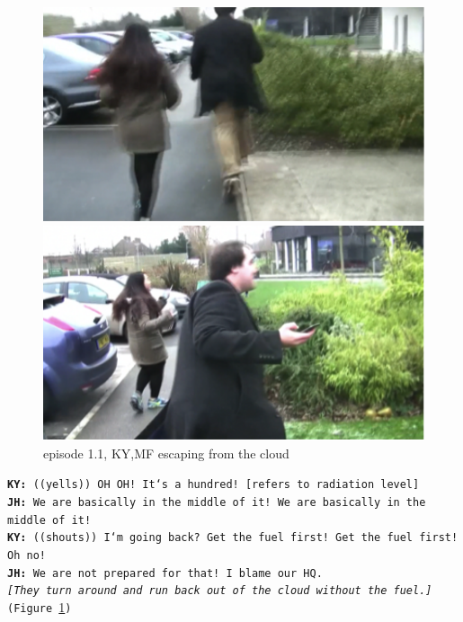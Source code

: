 \begin{figure}[ht]
\centering
\begin{minipage}[b]{0.45\linewidth}
\includegraphics[width=1\textwidth]{img/study1/ep1/ep13}
\caption{episode 1.1, KY,MF running into cloud}
\label{fig:study1ep13}
\end{minipage}
\quad
\begin{minipage}[b]{0.45\linewidth}
 \includegraphics[width=1\textwidth]{img/study1/ep1/ep14}
\caption{episode 1.1, KY,MF escaping from the cloud}
\label{fig:study1ep14}
\end{minipage}
\end{figure}
\noindent\texttt{\textbf{KY:} ((yells)) OH OH! It`s a hundred! [refers to radiation level]\\
\textbf{JH:} We are basically in the middle of it! We are basically in the middle of it!\\
\textbf{KY:} ((shouts)) I`m going back? Get the fuel first! Get the fuel first! Oh no! \\
\textbf{JH:} We are not prepared for that! I blame our HQ.\\
\emph{ [They turn around and run back out of the cloud without the fuel.] }(Figure \ref{fig:study1ep14})\\
}



